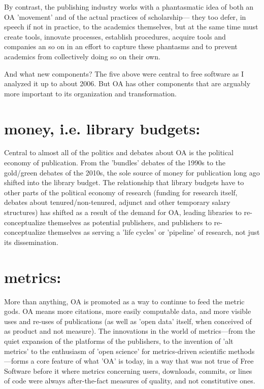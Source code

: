 \documentclass[11pt]{report}
\begin{document}
By contrast, the publishing industry works with a phantasmatic idea of both an OA 'movement' and of the actual practices of scholarship--- they too defer, in speech if not in practice, to the academics themselves, but at the same time must create tools, innovate processes, establish procedures, acquire tools and companies an so on in an effort to capture these phantasms and to prevent academics from collectively doing so on their own. 


And what new components?  The five above were central to free software as I analyzed it up to about 2006.  But OA has other components that are arguably more important to its organization and transformation.

\section*{\textbf{money, i.e. library budgets}:}
\label{sec:org34a524b}
Central to almost all of the politics and debates about OA is the political economy of publication.  From the 'bundles' debates of the 1990s to the gold/green debates of the 2010s, the sole source of money for publication long ago shifted into the library budget. The relationship that library budgets have to other parts of the political economy of research (funding for research itself, debates about tenured/non-tenured, adjunct and other temporary salary structures) has shifted as a result of the demand for OA, leading libraries to re-conceptualize themselves as potential publishers, and publishers to re-conceptualize themselves as serving a 'life cycles' or 'pipeline' of research, not just its dissemination.

\section*{\textbf{metrics}:}
\label{sec:org86adc1a}
More than anything, OA is promoted as a way to continue to feed the metric gods.  OA means more citations, more easily computable data, and more visible uses and re-uses of publications (as well as 'open data' itself, when conceived of as product and not measure).  The innovations in the world of metrics---from the quiet expansion of the platforms of the publishers, to the invention of 'alt metrics' to the enthusiasm of 'open science' for metrics-driven scientific methods---forms a core feature of what 'OA' is today, in a way that was not true of Free Software before it where metrics concerning users, downloads, commits, or lines of code were always after-the-fact measures of quality, and not constitutive ones.  
\end{document}
